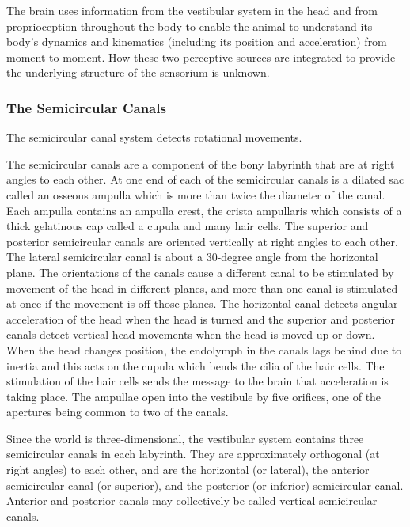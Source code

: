 The brain uses information from the vestibular system in the head and
from proprioception throughout the body to enable the animal to
understand its body's dynamics and kinematics (including its position
and acceleration) from moment to moment. How these two perceptive
sources are integrated to provide the underlying structure of the
sensorium is unknown.

\hypertarget{the-semicircular-canals}{%
\subsubsection{The Semicircular Canals}\label{the-semicircular-canals}}

The semicircular canal system detects rotational movements.

The semicircular canals are a component of the bony labyrinth that are
at right angles to each other. At one end of each of the semicircular
canals is a dilated sac called an osseous ampulla which is more than
twice the diameter of the canal. Each ampulla contains an ampulla crest,
the crista ampullaris which consists of a thick gelatinous cap called a
cupula and many hair cells. The superior and posterior semicircular
canals are oriented vertically at right angles to each other. The
lateral semicircular canal is about a 30-degree angle from the
horizontal plane. The orientations of the canals cause a different canal
to be stimulated by movement of the head in different planes, and more
than one canal is stimulated at once if the movement is off those
planes. The horizontal canal detects angular acceleration of the head
when the head is turned and the superior and posterior canals detect
vertical head movements when the head is moved up or down. When the head
changes position, the endolymph in the canals lags behind due to inertia
and this acts on the cupula which bends the cilia of the hair cells. The
stimulation of the hair cells sends the message to the brain that
acceleration is taking place. The ampullae open into the vestibule by
five orifices, one of the apertures being common to two of the canals.

Since the world is three-dimensional, the vestibular system contains
three semicircular canals in each labyrinth. They are approximately
orthogonal (at right angles) to each other, and are the horizontal (or
lateral), the anterior semicircular canal (or superior), and the
posterior (or inferior) semicircular canal. Anterior and posterior
canals may collectively be called vertical semicircular canals.

